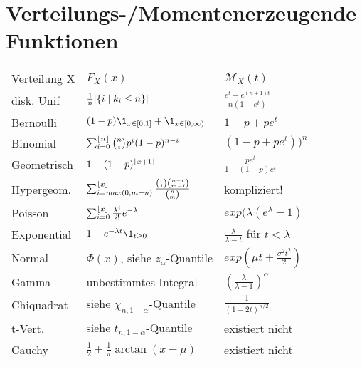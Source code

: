 \section{\small{Verteilungs-/Momentenerzeugende Funktionen}}
\begin{tabular}{ l l l}
	Verteilung X & \( F_X(x) \)                                                                                            & \( \mathcal{M}_X(t) \)                                      \\
	disk. Unif   & \( \frac{1}{n} \lvert  \{ i \mid k_i \leq n \}  \rvert \)                                                       & \( \frac{e^{t}-e^{(n+1)t}}{n(1-e^t)} \)                     \\
	Bernoulli    & \( (1-p) \1_{x \in [0,1]} + \1_{x \in [0,\infty)}\)                                                     & \( 1-p + p e^t\)                                            \\
	Binomial     & \( \sum_{i=0}^{\lfloor n \rfloor} {n \choose i} p^i (1-p)^{n-i} \)                                              & \( (1-p + p e^t))^n\)                                       \\
	Geometrisch  & \( 1 - (1 -p)^{\lfloor x + 1 \rfloor}\)                                                                         & \( \frac{p e^t}{ 1 - (1-p)e^t}\)                            \\
	Hypergeom.   & \( \sum_{i=max(0,m-n)}^{\lfloor x \rfloor} \frac{ {r \choose i} {{n - r} \choose {m - i} } }{ {n \choose m} }\) & kompliziert!                                                \\
	Poisson      & \( \sum_{i=0}^{\lfloor x \rfloor} \frac{\lambda^i}{i!} e^{-\lambda} \)                                          & \(exp(\lambda (e^{\lambda} - 1 )\)                          \\
	Exponential  & \( 1-e^{-\lambda t} \1_{t \geq 0} \)                                                                    & \( \frac{\lambda}{\lambda -t }\) \quad für \(t < \lambda \) \\
	Normal       & \(\Phi(x)\), siehe \(z_\alpha\)-Quantile                                                                & \( exp(\mu t + \frac{\sigma^2 t^2}{2} ) \)                  \\
	Gamma        & unbestimmtes Integral                                                                                   & \( ( \frac{ \lambda }{ \lambda - 1 } )^{\alpha} \)          \\
	Chiquadrat   & siehe \( \chi_{n,1 - \alpha} \)-Quantile                                                                & \( \frac{1}{ (1 - 2t)^{n/2} }\)                             \\
	t-Vert.      & siehe \( t_{n,1-\alpha} \)-Quantile                                                                     & existiert nicht                                             \\
	Cauchy       & \( \frac{1}{2} + \frac{1}{\pi} \arctan{(x-\mu)} \)                                                      & existiert nicht
\end{tabular}

